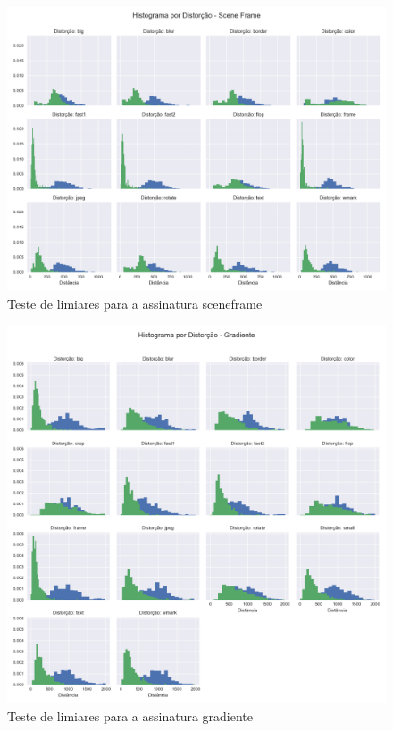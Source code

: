 \begin{figure}[h]
	\centering
	\label{fig:limiares-sceneframe}
	\caption{Teste de limiares para a assinatura sceneframe}
	\includegraphics[width=\textwidth]{dados/figuras/experimentos/histograma_distorcao_Scene_Frame.png}
\end{figure}
\begin{figure}[h]
	\centering
	\label{fig:limiares-gradiente}
	\caption{Teste de limiares para a assinatura gradiente}
	\includegraphics[width=\textwidth]{dados/figuras/experimentos/histograma_distorcao_Gradiente.png}
\end{figure}
